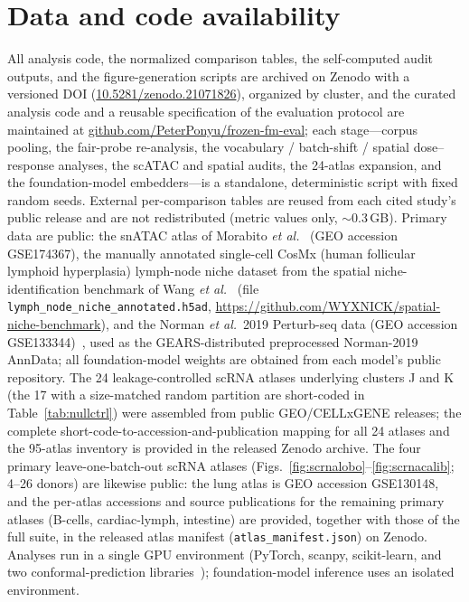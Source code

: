 \documentclass[fleqn,10pt,lineno]{wlpeerj}  %
\begin{document}
\section*{Data and code availability}
All analysis code, the normalized comparison tables, the self-computed audit outputs, and the figure-generation scripts are archived on Zenodo with a versioned DOI (\href{https://doi.org/10.5281/zenodo.21071826}{10.5281/zenodo.21071826}), organized by cluster, and the curated analysis code and a reusable specification of the evaluation protocol are maintained at \href{https://github.com/PeterPonyu/frozen-fm-eval}{github.com/PeterPonyu/frozen-fm-eval}; each stage---corpus pooling, the fair-probe re-analysis, the vocabulary / batch-shift / spatial dose--response analyses, the scATAC and spatial audits, the 24-atlas expansion, and the foundation-model embedders---is a standalone, deterministic script with fixed random seeds. External per-comparison tables are reused from each cited study's public release and are not redistributed (metric values only, $\sim$0.3\,GB). Primary data are public: the snATAC atlas of Morabito \emph{et al.}~\cite{morabito2021} (GEO accession GSE174367), the manually annotated single-cell CosMx (human follicular lymphoid hyperplasia) lymph-node niche dataset from the spatial niche-identification benchmark of Wang \emph{et al.}~\cite{wang2026niche} (file \texttt{lymph\_node\_niche\_annotated.h5ad}, \url{https://github.com/WYXNICK/spatial-niche-benchmark}), and the Norman \emph{et al.}\ 2019 Perturb-seq data (GEO accession GSE133344)~\cite{norman2019}, used as the GEARS-distributed preprocessed Norman-2019 AnnData; all foundation-model weights are obtained from each model's public repository. The 24 leakage-controlled scRNA atlases underlying clusters J and K (the 17 with a size-matched random partition are short-coded in Table~\ref{tab:nullctrl}) were assembled from public GEO/CELLxGENE releases; the complete short-code-to-accession-and-publication mapping for all 24 atlases and the 95-atlas inventory is provided in the released Zenodo archive. The four primary leave-one-batch-out scRNA atlases (Figs.~\ref{fig:scrnalobo}--\ref{fig:scrnacalib}; 4--26 donors) are likewise public: the lung atlas is GEO accession GSE130148, and the per-atlas accessions and source publications for the remaining primary atlases (B-cells, cardiac-lymph, intestine) are provided, together with those of the full suite, in the released atlas manifest (\texttt{atlas\_manifest.json}) on Zenodo. Analyses run in a single GPU environment (PyTorch, scanpy, scikit-learn, and two conformal-prediction libraries~\cite{crepes,mapie}); foundation-model inference uses an isolated environment.
\end{document}
